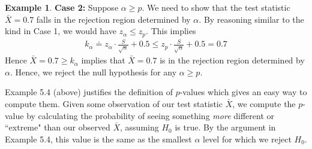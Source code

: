 \documentclass[11pt,letterpaper]{article}
\numberwithin{theorem}{section}
\numberwithin{definition}{section}
\numberwithin{lemma}{section}
\numberwithin{corollary}{section}
\numberwithin{proposition}{section}
\theoremstyle{definition}
\numberwithin{remark}{section}
\numberwithin{claim}{section}
\numberwithin{observation}{section}
\numberwithin{fact}{section}
\numberwithin{assumption}{section}
\newtheorem{example}[theorem]{Example}
\numberwithin{example}{section}
\numberwithin{exercise}{section}
\begin{document}
\begin{example}
\textbf{Case 2:} Suppose $\alpha \geq p$. We need to show that the test statistic $\bar{X} = 0.7$ falls in the rejection region determined by $\alpha$. By reasoning similar to the kind in Case 1, we would have $z_{\alpha} \leq z_{p}$. This implies
\begin{align*}
k_{\alpha} \doteq z_{\alpha} \cdot \frac{S}{\sqrt{n}} + 0.5 \leq z_{p} \cdot \frac{S}{\sqrt{n}} + 0.5 = 0.7
\end{align*}
Hence $\bar{X} = 0.7 \geq k_{\alpha}$ implies that $\bar{X} = 0.7$ is in the rejection region determined by $\alpha$. Hence, we reject the null hypothesis for any $\alpha \geq p$.
%
\end{example}
Example 5.4 (above) justifies the definition of $p$-values which gives an easy way to compute them. Given some observation of our test statistic $\bar{X}$, we compute the $p$-value by calculating the probability of seeing something \textit{more} different or ``extreme" than our observed $\bar{X}$, assuming $H_0$ is true. By the argument in Example 5.4, this value is the same as the smallest $\alpha$ level for which we reject $H_0$.

\newpage
\end{document}
